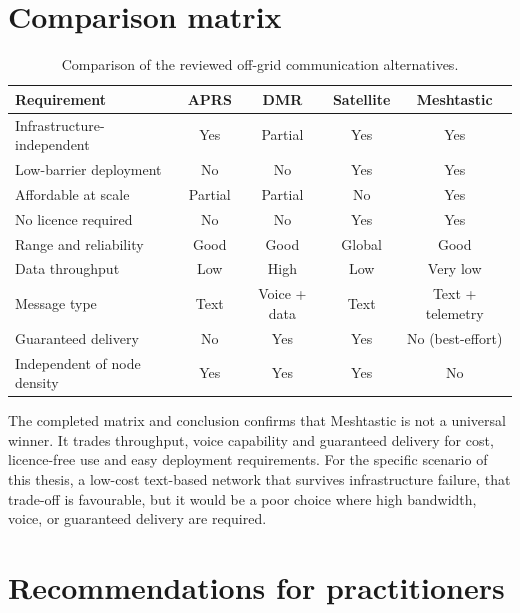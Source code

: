 \section{Comparison matrix}%
\label{sec:conclusion-comparison}
\begin{table}[H]
  \centering
  \begin{tabular}{lcccc}
    \toprule
    \textbf{Requirement} & \textbf{APRS} & \textbf{DMR} & \textbf{Satellite} & \textbf{Meshtastic} \\
    \midrule
    Infrastructure-independent   & Yes     & Partial & Yes    & Yes             \\
    Low-barrier deployment       & No      & No      & Yes    & Yes             \\
    Affordable at scale          & Partial & Partial & No     & Yes             \\
    No licence required          & No      & No      & Yes    & Yes             \\
    Range and reliability        & Good    & Good    & Global & Good            \\
    \midrule
    Data throughput              & Low     & High    & Low    & Very low        \\
    Message type                 & Text    & Voice + data & Text & Text + telemetry \\
    Guaranteed delivery          & No      & Yes     & Yes    & No (best-effort) \\
    Independent of node density  & Yes     & Yes     & Yes    & No              \\
    \bottomrule
  \end{tabular}
  \caption[Comparison of off-grid communication alternatives.]{\label{tab:conclusion-comparison}Comparison of the reviewed off-grid communication alternatives.}
\end{table}

The completed matrix and conclusion confirms that Meshtastic is not a universal winner.
It trades throughput, voice capability and guaranteed delivery for cost, licence-free use and easy deployment requirements.
For the specific scenario of this thesis, a low-cost text-based network that survives infrastructure failure, that trade-off is favourable, but it would be a poor choice where high bandwidth, voice, or guaranteed delivery are required.

\section{Recommendations for practitioners}%
\label{sec:conclusion-recommendations}

